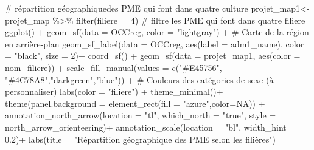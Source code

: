 \documentclass[
  letterpaper,
  DIV=11,
  numbers=noendperiod]{scrartcl}
\newenvironment{Shaded}{\begin{snugshade}}{\end{snugshade}}
\newcommand{\AttributeTok}[1]{\textcolor[rgb]{0.40,0.45,0.13}{#1}}
\newcommand{\CommentTok}[1]{\textcolor[rgb]{0.37,0.37,0.37}{#1}}
\newcommand{\ConstantTok}[1]{\textcolor[rgb]{0.56,0.35,0.01}{#1}}
\newcommand{\DecValTok}[1]{\textcolor[rgb]{0.68,0.00,0.00}{#1}}
\newcommand{\FloatTok}[1]{\textcolor[rgb]{0.68,0.00,0.00}{#1}}
\newcommand{\FunctionTok}[1]{\textcolor[rgb]{0.28,0.35,0.67}{#1}}
\newcommand{\NormalTok}[1]{\textcolor[rgb]{0.00,0.23,0.31}{#1}}
\newcommand{\OtherTok}[1]{\textcolor[rgb]{0.00,0.23,0.31}{#1}}
\newcommand{\SpecialCharTok}[1]{\textcolor[rgb]{0.37,0.37,0.37}{#1}}
\newcommand{\StringTok}[1]{\textcolor[rgb]{0.13,0.47,0.30}{#1}}
\begin{document}
\begin{Shaded}
\begin{Highlighting}[]
\CommentTok{\# répartition géographiquedes PME qui font dans quatre  culture}
\NormalTok{projet\_map1}\OtherTok{\textless{}{-}}\NormalTok{projet\_map }\SpecialCharTok{\%\textgreater{}\%} \FunctionTok{filter}\NormalTok{(filiere}\SpecialCharTok{==}\DecValTok{4}\NormalTok{) }\CommentTok{\# filtre les PME qui font dans quatre filiere}
\FunctionTok{ggplot}\NormalTok{() }\SpecialCharTok{+}
  \FunctionTok{geom\_sf}\NormalTok{(}\AttributeTok{data =}\NormalTok{ OCCreg, }\AttributeTok{color =} \StringTok{"lightgray"}\NormalTok{) }\SpecialCharTok{+}  \CommentTok{\# Carte de la région en arrière{-}plan}
  \FunctionTok{geom\_sf\_label}\NormalTok{(}\AttributeTok{data =}\NormalTok{ OCCreg, }\FunctionTok{aes}\NormalTok{(}\AttributeTok{label =}\NormalTok{ adm1\_name), }\AttributeTok{color =} \StringTok{"black"}\NormalTok{, }\AttributeTok{size =} \DecValTok{2}\NormalTok{)}\SpecialCharTok{+}
  \FunctionTok{coord\_sf}\NormalTok{() }\SpecialCharTok{+}
  \FunctionTok{geom\_sf}\NormalTok{(}\AttributeTok{data =}\NormalTok{ projet\_map1, }\FunctionTok{aes}\NormalTok{(}\AttributeTok{color =}\NormalTok{ nom\_filiere)) }\SpecialCharTok{+}
  \FunctionTok{scale\_fill\_manual}\NormalTok{(}\AttributeTok{values =} \FunctionTok{c}\NormalTok{(}\StringTok{"\#E45756"}\NormalTok{, }\StringTok{"\#4C78A8"}\NormalTok{,}\StringTok{"darkgreen"}\NormalTok{,}\StringTok{"blue"}\NormalTok{)) }\SpecialCharTok{+}  \CommentTok{\# Couleurs des catégories de sexe (à personnaliser)}
  \FunctionTok{labs}\NormalTok{(}\AttributeTok{color =} \StringTok{"filiere"}\NormalTok{) }\SpecialCharTok{+}
  \FunctionTok{theme\_minimal}\NormalTok{()}\SpecialCharTok{+}
  \FunctionTok{theme}\NormalTok{(}\AttributeTok{panel.background =} \FunctionTok{element\_rect}\NormalTok{(}\AttributeTok{fill =} \StringTok{"azure"}\NormalTok{,}\AttributeTok{color=}\ConstantTok{NA}\NormalTok{)) }\SpecialCharTok{+}
  \FunctionTok{annotation\_north\_arrow}\NormalTok{(}\AttributeTok{location =} \StringTok{"tl"}\NormalTok{, }\AttributeTok{which\_north =} \StringTok{"true"}\NormalTok{, }\AttributeTok{style =}\NormalTok{ north\_arrow\_orienteering)}\SpecialCharTok{+}
  \FunctionTok{annotation\_scale}\NormalTok{(}\AttributeTok{location =} \StringTok{"bl"}\NormalTok{, }\AttributeTok{width\_hint =} \FloatTok{0.2}\NormalTok{)}\SpecialCharTok{+}
  \FunctionTok{labs}\NormalTok{(}\AttributeTok{title =} \StringTok{"Répartition géographique des PME selon les filières"}\NormalTok{)}
\end{Highlighting}
\end{Shaded}
\end{document}
